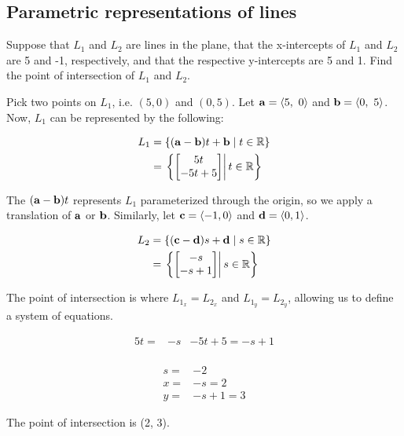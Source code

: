 \documentclass[../main.tex]{subfiles}
\begin{document}
\subsection{Parametric representations of lines}

\begin{example}
	Suppose that $L_1$ and $L_2$ are lines in the plane, that the
	x-intercepts of $L_1$ and $L_2$ are 5 and -1, respectively, and that the
	respective y-intercepts are 5 and 1. Find the point of intersection
	of $L_1$ and $L_2$.
\end{example}

\begin{solution}
	Pick two points on $L_1$,
	i.e. $(5, 0)$ and $(0, 5)$. Let $\mathbf{a}=\langle 5,\ 0\rangle$ and $\mathbf{b}=\langle 0,\ 5\rangle$.
	Now, $L_1$ can be represented by the following:

	\begin{equation*}
		\begin{split}
			L_1 & =  \{ (\mathbf{a} - \mathbf{b})t + \mathbf{b} \mid t \in \mathbb{R} \}                                \\
			    & =      \left. \left\{ \begin{bmatrix} 5t\\-5t+5 \end{bmatrix} \right| t \in \mathbb{R} \right\}
		\end{split}
	\end{equation*}

	The $(\mathbf{a} - \mathbf{b})t$ represents $L_1$ parameterized through the origin,
	so we apply a translation of $\mathbf{a}$ or $\mathbf{b}$. Similarly,
	let $\mathbf{c}= \langle -1, 0 \rangle$ and $\mathbf{d}= \langle 0, 1 \rangle$.

	\begin{equation*}
		\begin{split}
			L_2 & =  \{ (\mathbf{c} - \mathbf{d})s + \mathbf{d} \mid s \in \mathbb{R} \}                                 \\
			    & =      \left. \left\{ \begin{bmatrix} -s \\ -s+1 \end{bmatrix} \right| s \in \mathbb{R} \right\}
		\end{split}
	\end{equation*}

	The point of intersection is where $L_{1_x}=L_{2_x}$ and $L_{1_y}=L_{2_y}$,
	allowing us to define a system of equations.

	\begin{align*}
		5t= & -s & -5t+5=-s+1 \\
	\end{align*}

	\begin{align*}
		s= & -2     \\
		x= & -s=2   \\
		y= & -s+1=3
	\end{align*}

	The point of intersection is (2, 3). \qedsymbol
\end{solution}
\end{document}
